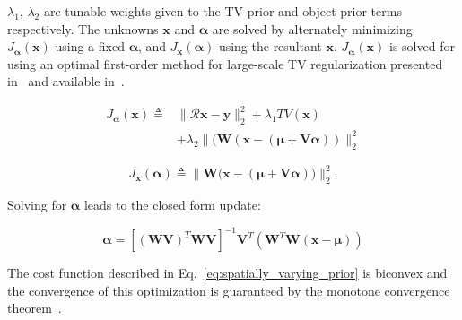 \documentclass[journal]{IEEEtran}
\def\x{{\mathbf x}}
\begin{document}
$\lambda_1$, $\lambda_2$ are tunable weights given to the
TV-prior and object-prior terms respectively. The unknowns
$\boldsymbol{x}$ and $\boldsymbol{\alpha}$ are solved by alternately
minimizing $J_{\boldsymbol{\alpha}}(\boldsymbol{x})$ using a fixed
$\boldsymbol{\alpha}$, and $J_{\boldsymbol{x}}(\boldsymbol{\alpha})$
using the resultant $\boldsymbol{x}$.
$J_{\boldsymbol{\alpha}}(\boldsymbol{x})$ is solved for using an
optimal first-order method for large-scale TV regularization presented
in~\cite{TVReg} and available in~\cite{TVReg-lib}.

\begin{equation}
  \begin{split}
    J_{\boldsymbol{\alpha}}(\boldsymbol{\x}) \triangleq &\lVert\boldsymbol{\mathcal{R} x- y}\rVert_2^2  + \lambda_1TV(\boldsymbol{x}) \\
    &+\lambda_2\lVert(\boldsymbol{W}(\boldsymbol{x} - (\boldsymbol{\mu + V\alpha}))\rVert_2^2
  \end{split}
    \label{eq:compute_x}
  \end{equation}
  
\begin{equation}
  J_{\boldsymbol{x}}(\boldsymbol{\alpha}) \triangleq \lVert{\boldsymbol{W}(\boldsymbol{x}} - (\boldsymbol{\mu + V\alpha}))\rVert_2^2.
\end{equation}

Solving for $\boldsymbol{\alpha}$ leads to the closed form update:

\begin{equation}
  \boldsymbol{\alpha} = [(\boldsymbol{WV})^T\boldsymbol{WV}]^{-1}\boldsymbol{V}^T(\boldsymbol{W}^T\boldsymbol{W}(\boldsymbol{x} - \boldsymbol{\mu}))
  \label{eq:compute_alpha}
\end{equation}

The cost function described in Eq.~\ref{eq:spatially_varying_prior} is biconvex and the convergence of this optimization is guaranteed by the monotone convergence theorem~\cite{monotone}.
\end{document}
